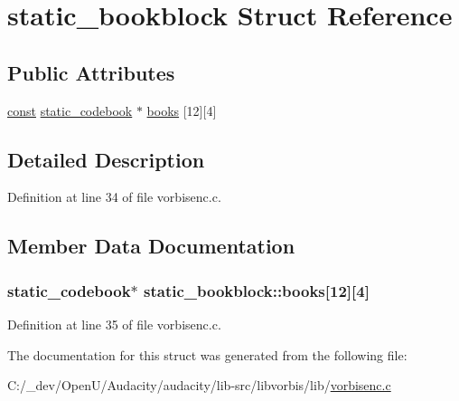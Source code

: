 \hypertarget{structstatic__bookblock}{}\section{static\+\_\+bookblock Struct Reference}
\label{structstatic__bookblock}
\subsection*{Public Attributes}
\begin{DoxyCompactItemize}
\item 
\hyperlink{getopt1_8c_a2c212835823e3c54a8ab6d95c652660e}{const} \hyperlink{structstatic__codebook}{static\+\_\+codebook} $\ast$ \hyperlink{structstatic__bookblock_ad5de4a859b40179c2b5157e7409c92d0}{books} \mbox{[}12\mbox{]}\mbox{[}4\mbox{]}
\end{DoxyCompactItemize}


\subsection{Detailed Description}


Definition at line 34 of file vorbisenc.\+c.



\subsection{Member Data Documentation}
\subsubsection[{\texorpdfstring{books}{books}}]{ {\bf static\+\_\+codebook}$\ast$ static\+\_\+bookblock\+::books\mbox{[}12\mbox{]}\mbox{[}4\mbox{]}}\hypertarget{structstatic__bookblock_ad5de4a859b40179c2b5157e7409c92d0}{}\label{structstatic__bookblock_ad5de4a859b40179c2b5157e7409c92d0}


Definition at line 35 of file vorbisenc.\+c.



The documentation for this struct was generated from the following file\+:\begin{DoxyCompactItemize}
\item 
C\+:/\+\_\+dev/\+Open\+U/\+Audacity/audacity/lib-\/src/libvorbis/lib/\hyperlink{vorbisenc_8c}{vorbisenc.\+c}\end{DoxyCompactItemize}
